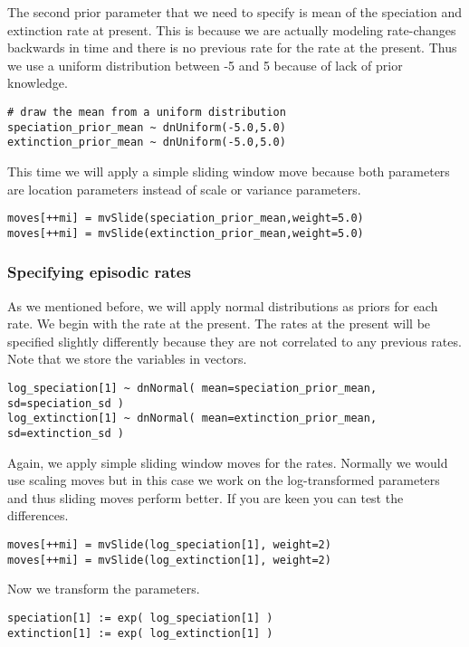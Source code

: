 The second prior parameter that we need to specify is mean of the speciation and extinction rate at present.
This is because we are actually modeling rate-changes backwards in time and there is no previous rate for the rate at the present.
Thus we use a uniform distribution between -5 and 5 because of lack of prior knowledge.
{\tt \begin{snugshade*}
\begin{lstlisting}
# draw the mean from a uniform distribution
speciation_prior_mean ~ dnUniform(-5.0,5.0)
extinction_prior_mean ~ dnUniform(-5.0,5.0)
\end{lstlisting}
\end{snugshade*}}
This time we will apply a simple sliding window move because both parameters are location parameters instead of scale or variance parameters.
{\tt \begin{snugshade*}
\begin{lstlisting}
moves[++mi] = mvSlide(speciation_prior_mean,weight=5.0)
moves[++mi] = mvSlide(extinction_prior_mean,weight=5.0)
\end{lstlisting}
\end{snugshade*}}


\subsubsection{Specifying episodic rates}
As we mentioned before, we will apply normal distributions as priors for each rate.
We begin with the rate at the present.
The rates at the present will be specified slightly differently because they are not correlated to any previous rates.
Note that we store the variables in vectors.
{\tt \begin{snugshade*}
\begin{lstlisting}
log_speciation[1] ~ dnNormal( mean=speciation_prior_mean, sd=speciation_sd )
log_extinction[1] ~ dnNormal( mean=extinction_prior_mean, sd=extinction_sd )
\end{lstlisting}
\end{snugshade*}}
Again, we apply simple sliding window moves for the rates.
Normally we would use scaling moves but in this case we work on the log-transformed parameters and thus sliding moves perform better.
If you are keen you can test the differences.
{\tt \begin{snugshade*}
\begin{lstlisting}
moves[++mi] = mvSlide(log_speciation[1], weight=2)
moves[++mi] = mvSlide(log_extinction[1], weight=2)
\end{lstlisting}
\end{snugshade*}}
Now we transform the parameters.
{\tt \begin{snugshade*}
\begin{lstlisting}
speciation[1] := exp( log_speciation[1] )
extinction[1] := exp( log_extinction[1] )
\end{lstlisting}
\end{snugshade*}}

